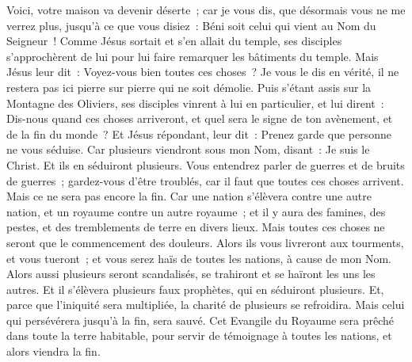 \begin{multicols}{2}
Voici, votre maison va devenir déserte~;
car je vous dis, que désormais vous ne me verrez plus, jusqu'à ce que vous disiez~: Béni soit celui qui vient au Nom du Seigneur~!
\VerseOne{}Comme Jésus sortait et s'en allait du temple, ses disciples s'approchèrent de lui pour lui faire remarquer les bâtiments du temple.
Mais Jésus leur dit~: Voyez-vous bien toutes ces choses~? Je vous le dis en vérité, il ne restera pas ici pierre sur pierre qui ne soit démolie.
Puis s'étant assis sur la Montagne des Oliviers, ses disciples vinrent à lui en particulier, et lui dirent~: Dis-nous quand ces choses arriveront, et quel sera le signe de ton avènement, et de la fin du monde~?
Et Jésus répondant, leur dit~: Prenez garde que personne ne vous séduise.
Car plusieurs viendront sous mon Nom, disant~: Je suis le Christ. Et ils en séduiront plusieurs.
Vous entendrez parler de guerres et de bruits de guerres~; gardez-vous d'être troublés, car il faut que toutes ces choses arrivent. Mais ce ne sera pas encore la fin.
Car une nation s'élèvera contre une autre nation, et un royaume contre un autre royaume~; et il y aura des famines, des pestes, et des tremblements de terre en divers lieux.
Mais toutes ces choses ne seront que le commencement des douleurs.
Alors ils vous livreront aux tourments, et vous tueront~; et vous serez haïs de toutes les nations, à cause de mon Nom.
Alors aussi plusieurs seront scandalisés, se trahiront et se haïront les uns les autres.
Et il s'élèvera plusieurs faux prophètes, qui en séduiront plusieurs.
Et, parce que l'iniquité sera multipliée, la charité de plusieurs se refroidira.
Mais celui qui persévérera jusqu'à la fin, sera sauvé.
Cet Evangile du Royaume sera prêché dans toute la terre habitable, pour servir de témoignage à toutes les nations, et alors viendra la fin.

\end{multicols}
